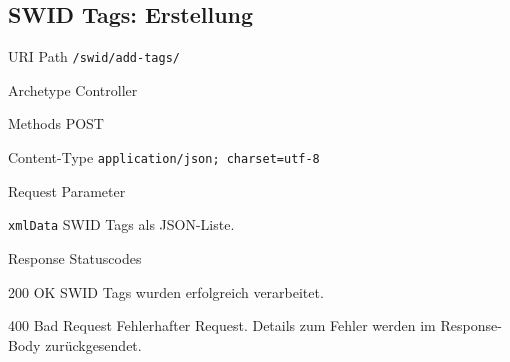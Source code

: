 \documentclass[10pt,a4paper]{scrartcl}
\begin{document}
\subsection{SWID Tags: Erstellung}
\label{api:create}

\begin{mdframed}[style=def]
\begin{description*}
	\item[URI Path] \texttt{/swid/add-tags/}
	\item[Archetype] Controller
	\item[Methods] POST
	\item[Content-Type] \texttt{application/json; charset=utf-8}
	\item[Request Parameter] \hfill
		\begin{description*}
			\item[\texttt{xmlData}] SWID Tags als JSON-Liste.
		\end{description*}
	\item[Response Statuscodes] \hfill
		\begin{description*}
			\item[200 OK] SWID Tags wurden erfolgreich verarbeitet.
			\item[400 Bad Request] Fehlerhafter Request. Details zum Fehler werden im
				Response-Body zurückgesendet.
		\end{description*}
\end{description*}
\end{mdframed}
\end{document}
